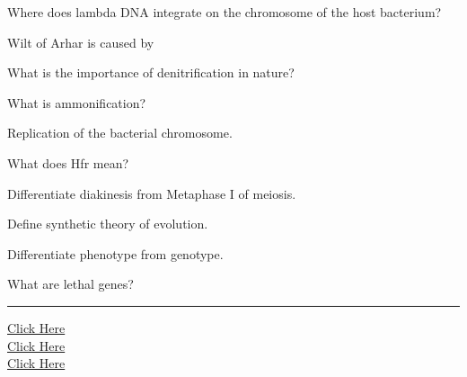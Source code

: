 \documentclass[11pt,a4paper]{article}
\begin{document}
\begin{parts}
  \item Where does lambda DNA integrate on the chromosome of the host bacterium?
  \item Wilt of Arhar is caused by \makebox[3cm]{\hrulefill}
  \item What is the importance of denitrification in nature?
  \item What is ammonification?
  \item Replication of the bacterial chromosome.
  \item What does Hfr mean?
  \item Differentiate diakinesis from Metaphase I of meiosis.
  \item Define synthetic theory of evolution.
  \item Differentiate phenotype from genotype.
  \item What are lethal genes?
\end{parts}

\vfill
\rule{\linewidth}{0.4pt}

\begin{center}\small
\href{https://bhu-exam.vercel.app/}{Click Here}\\[4pt]\href{https://me-aryan.vercel.app/}{Click Here}\\[4pt]\href{https://quashan-me.vercel.app/}{Click Here}
\end{center}
\end{document}
